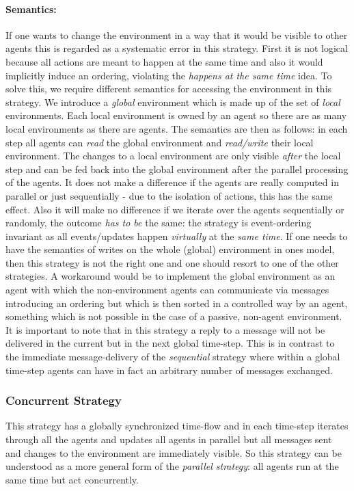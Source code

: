 \paragraph{Semantics:} If one wants to change the environment in a way that it would be visible to other agents this is regarded as a systematic error in this strategy. First it is not logical because all actions are meant to happen at the same time and also it would implicitly induce an ordering, violating the \textit{happens at the same time} idea. To solve this, we require different semantics for accessing the environment in this strategy. We introduce a \textit{global} environment which is made up of the set of \textit{local} environments. Each local environment is owned by an agent so there are as many local environments as there are agents. The semantics are then as follows: in each step all agents can \textit{read} the global environment and \textit{read/write} their local environment. The changes to a local environment are only visible \textit{after} the local step and can be fed back into the global environment after the parallel processing of the agents. 
It does not make a difference if the agents are really computed in parallel or just sequentially - due to the isolation of actions, this has the same effect. Also it will make no difference if we iterate over the agents sequentially or randomly, the outcome \textit{has to be} the same: the strategy is event-ordering invariant as all events/updates happen \textit{virtually} at the \textit{same time}. If one needs to have the semantics of writes on the whole (global) environment in ones model, then this strategy is not the right one and one should resort to one of the other strategies. A workaround would be to implement the global environment as an agent with which the non-environment agents can communicate via messages introducing an ordering but which is then sorted in a controlled way by an agent, something which is not possible in the case of a passive, non-agent environment.
It is important to note that in this strategy a reply to a message will not be delivered in the current but in the next global time-step. This is in contrast to the immediate message-delivery of the \textit{sequential} strategy where within a global time-step agents can have in fact an arbitrary number of messages exchanged. \\

\subsubsection{Concurrent Strategy}
This strategy has a globally synchronized time-flow and in each time-step iterates through all the agents and updates all agents in parallel but all messages sent and changes to the environment are immediately visible. So this strategy can be understood as a more general form of the \textit{parallel strategy}: all agents run at the same time but act concurrently. \\

